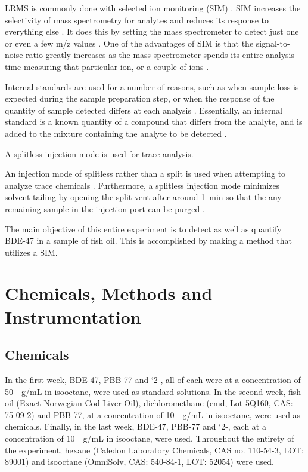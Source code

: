 \documentclass[a4paper, 12pt]{article}
\begin{document}
LRMS is commonly done with selected ion monitoring (SIM) \cite{bjorklund_mass_2003}. SIM increases the selectivity of mass spectrometry for analytes and reduces its response to everything else \cite{harris}. It does this by setting the mass spectrometer to detect just one or even a few m/z values \cite{harris}. One of the advantages of SIM is that the signal-to-noise ratio greatly increases as the mass spectrometer spends its entire analysis time measuring that particular ion, or a couple of ions \cite{harris}.

Internal standards are used for a number of reasons, such as when sample loss is expected during the sample preparation step, or when the response of the quantity of sample detected differs at each analysis \cite{harris}. Essentially, an internal standard is a known quantity of a compound that differs from the analyte, and is added to the mixture containing the analyte to be detected \cite{harris}. 

A splitless injection mode is used for trace analysis. 

An injection mode of splitless rather than a split is used when attempting to analyze trace chemicals \cite{harris}. Furthermore, a splitless injection mode minimizes solvent tailing by opening the split vent after around \SI{1}{min} so that the any remaining sample in the injection port can be purged \cite{vitha_chromatography:_2017}.

The main objective of this entire experiment is to detect as well as quantify BDE-47 in a sample of fish oil. This is accomplished by making a method that utilizes a SIM.


\section{Chemicals, Methods and Instrumentation}

\subsection{Chemicals}
In the first week, BDE-47, PBB-77 and `2-, all of each were at a concentration of \SI{50}{\mu{}g/mL} in isooctane, were used as standard solutions. In the second week, fish oil (Exact Norwegian Cod Liver Oil), dichloromethane (emd, Lot 5Q160, CAS: 75-09-2) and PBB-77, at a concentration of \SI{10}{\mu{}g/mL} in isooctane, were used as chemicals. Finally, in the last week, BDE-47, PBB-77 and `2-, each at a concentration of \SI{10}{\mu{}g/mL} in isooctane, were used. Throughout the entirety of the experiment, hexane (Caledon Laboratory Chemicals, CAS no. 110-54-3, LOT: 89001) and isooctane (OmniSolv, CAS: 540-84-1, LOT: 52054) were used.
\end{document}
